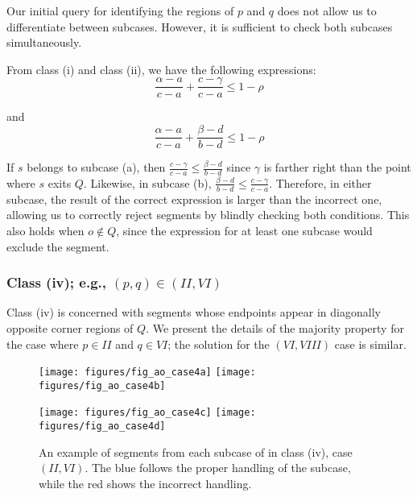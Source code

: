 Our initial query for identifying the regions of $p$ and $q$ does not allow us to differentiate between subcases. However, it is sufficient to check both subcases simultaneously.

From class (i) and class (ii), we have the following expressions:
\[ 
\frac{\alpha - a}{c - a} + \frac{c - \gamma}{c - a} \leq 1 - \rho
\]

\noindent and
\[ 
\frac{\alpha - a}{c - a} + \frac{\beta - d}{b - d} \leq 1 - \rho
\]

If $s$ belongs to subcase (a), then $\frac{c - \gamma}{c - a} \leq \frac{\beta - d}{b - d}$ since $\gamma$ is farther right than the point where $s$ exits $Q$. Likewise, in subcase (b), $\frac{\beta - d}{b - d} \leq \frac{c - \gamma}{c - a}$.  Therefore, in either subcase, the result of the correct expression is larger than the incorrect one, allowing us to correctly reject segments by blindly checking both conditions.  This also holds when $o \not \in Q$, since the expression for at least one subcase would exclude the segment.


\subsubsection{Class (iv); e.g., $(p, q) \in (II, VI)$}
\label{:rectanges:ao:class4}

Class (iv) is concerned with segments whose endpoints appear in diagonally opposite corner regions of $Q$. We present the details of the majority property for the case where $p \in II$ and $q \in VI$; the solution for the $(VI, VIII)$ case is similar.

\begin{figure}[t]
\begin{center}
  \texttt{[image: figures/fig\_ao\_case4a]}
  \hspace{1.0em}
  \texttt{[image: figures/fig\_ao\_case4b]}

  \vspace{2.0em}
  
  \texttt{[image: figures/fig\_ao\_case4c]}
  \hspace{1.0em}
  \texttt{[image: figures/fig\_ao\_case4d]}

  \caption[An example of a segment in class (iv), case $(II, VI)$.]{An example of segments from each subcase of in class (iv), case $(II, VI)$. The blue follows the proper handling of the subcase, while the red shows the incorrect handling.}
  \label{fig:rectangles:ao:case4}
\end{center}
\end{figure}


